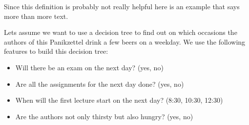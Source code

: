 \documentclass[english]{panikzettel}
\begin{document}
Since this definition is probably not really helpful here is an example that says more than more text.

Lets assume we want to use a decision tree to find out on which occasions the authors of this Panikzettel drink a few beers on a weekday. We use the following features to build this decision tree:
\begin{itemize}
\item Will there be an exam on the next day? (yes, no)
\item Are all the assignments for the next day done? (yes, no)
\item When will the first lecture start on the next day? (8:30, 10:30, 12:30)
\item Are the authors not only thirsty but also hungry? (yes, no)
\end{itemize}
\end{document}
